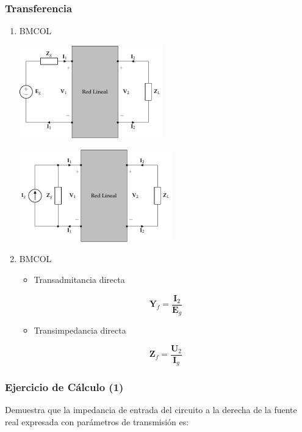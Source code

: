 \subsubsection{Transferencia}
\label{sec:orgb5d33e6}
\begin{enumerate}
\item \hfill{}\textsc{BMCOL}
\label{sec:org6258e98}

\includegraphics[height=4cm]{../figs/cuadripolo_cargado_fuente_tension.pdf}


\includegraphics[height=4cm]{../figs/cuadripolo_cargado_fuente_corriente.pdf}



\item \hfill{}\textsc{BMCOL}
\label{sec:org8c9bbdc}
\begin{itemize}
\item Transadmitancia directa
\end{itemize}
\[
\mathbf{Y}_f = \frac{\mathbf{I}_2}{\mathbf{E}_g}
\]

\begin{itemize}
\item Transimpedancia directa
\end{itemize}
\[
\mathbf{Z}_f = \frac{\mathbf{U}_2}{\mathbf{I}_g}
\]
\end{enumerate}

\subsubsection{Ejercicio de Cálculo (1)}
\label{sec:orgce5d563}

Demuestra que la impedancia de entrada del circuito a la derecha de la fuente real expresada con parámetros de transmisión es:

